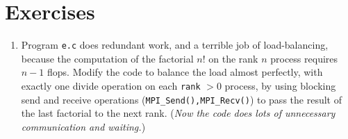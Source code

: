 \bigskip
\section{Exercises}

\renewcommand{\labelenumi}{\arabic{chapter}.\arabic{enumi}\quad}
\begin{enumerate}
\item Program \texttt{e.c} does redundant work, and a terrible job of load-balancing, because the computation of the factorial $n!$ on the rank $n$ process requires $n-1$ flops.  Modify the code to balance the load almost perfectly, with exactly one divide operation on each \texttt{rank} $>0$ process, by using blocking send and receive operations (\texttt{MPI\_Send(),MPI\_Recv()}) to pass the result of the last factorial to the next rank.  (\emph{Now the code does lots of unnecessary communication and waiting.})


\end{enumerate}
